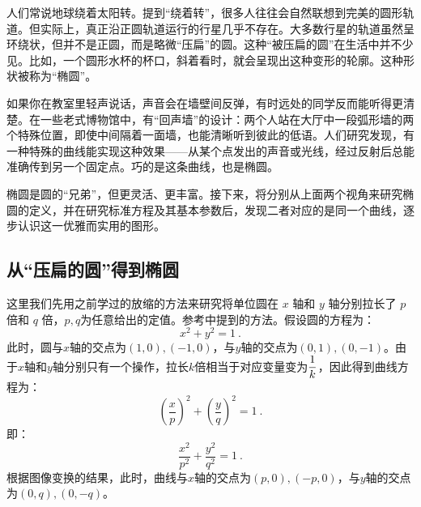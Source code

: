 
\begin{issues}
\issueDraft
\end{issues}



人们常说地球绕着太阳转。提到“绕着转”，很多人往往会自然联想到完美的圆形轨道。但实际上，真正沿正圆轨道运行的行星几乎不存在。大多数行星的轨道虽然呈环绕状，但并不是正圆，而是略微“压扁”的圆。这种“被压扁的圆”在生活中并不少见。比如，一个圆形水杯的杯口，斜着看时，就会呈现出这种变形的轮廓。这种形状被称为“椭圆”。

如果你在教室里轻声说话，声音会在墙壁间反弹，有时远处的同学反而能听得更清楚。在一些老式博物馆中，有“回声墙”的设计：两个人站在大厅中一段弧形墙的两个特殊位置，即使中间隔着一面墙，也能清晰听到彼此的低语。人们研究发现，有一种特殊的曲线能实现这种效果——从某个点发出的声音或光线，经过反射后总能准确传到另一个固定点。巧的是这条曲线，也是椭圆。

椭圆是圆的“兄弟”，但更灵活、更丰富。接下来，将分别从上面两个视角来研究椭圆的定义，并在研究标准方程及其基本参数后，发现二者对应的是同一个曲线，逐步认识这一优雅而实用的图形。

\subsection{从“压扁的圆”得到椭圆}

这里我们先用之前学过的放缩的方法来研究将单位圆在 $x$ 轴和 $y$ 轴分别拉长了 $p$ 倍和 $q$ 倍，$p,q$为任意给出的定值。参考中提到的方法。假设圆的方程为：
\begin{equation}
x^2 + y^2 = 1~.
\end{equation}
此时，圆与$x$轴的交点为$(1,0),(-1,0)$，与$y$轴的交点为$(0,1),(0,-1)$。由于$x$轴和$y$轴分别只有一个操作，拉长$k$倍相当于对应变量变为$\displaystyle{1\over k}$，因此得到曲线方程为：
\begin{equation}
\left(\frac{x}{p}\right)^2 + \left(\frac{y}{q}\right)^2 = 1~.
\end{equation}
即：
\begin{equation}\label{eq_Elips3_2}
\frac{x^2}{p^2} + \frac{y^2}{q^2} = 1~.
\end{equation}
根据图像变换的结果，此时，曲线与$x$轴的交点为$(p,0),(-p,0)$，与$y$轴的交点为$(0,q),(0,-q)$。

